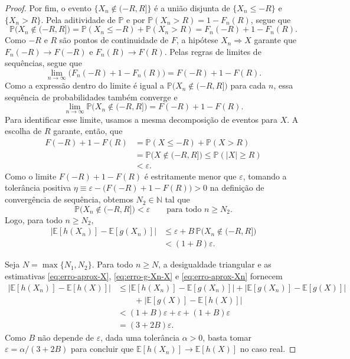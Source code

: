 \documentclass[12pt,portuguese]{article}
\theoremstyle{definition}
\theoremstyle{plainexercise}
\theoremstyle{starredexercise}
\theoremstyle{definition}
\begin{document}
\begin{proof}
Por fim, o evento $\{X_n\notin(-R,R]\}$ é a união disjunta de
$\{X_n\leqslant -R\}$ e $\{X_n>R\}$. Pela aditividade de $\mathbb{P}$ e por
$\mathbb{P}(X_n>R)=1-F_n(R)$, segue que
\[
\mathbb{P}\bigl(X_n\notin(-R,R]\bigr)
=\mathbb{P}(X_n\leqslant -R)+\mathbb{P}(X_n>R)
=F_n(-R)+1-F_n(R).
\]
Como $-R$ e $R$ são pontos de continuidade de $F$, a hipótese
$X_n\Rightarrow X$ garante que $F_n(-R)\to F(-R)$ e $F_n(R)\to F(R)$.
Pelas regras de limites de sequências, segue que
\[
\lim_{n\to\infty}\bigl(F_n(-R)+1-F_n(R)\bigr)
=F(-R)+1-F(R).
\]
Como a expressão dentro do limite é igual a
$\mathbb{P}\bigl(X_n\notin(-R,R]\bigr)$ para cada $n$, essa sequência de
probabilidades também converge e
\[
\lim_{n\to\infty}\mathbb{P}\bigl(X_n\notin(-R,R]\bigr)
=F(-R)+1-F(R).
\]
Para identificar esse limite, usamos a mesma decomposição de eventos para
$X$. A escolha de $R$ garante, então, que
\begin{align*}
F(-R)+1-F(R)
&=\mathbb{P}(X\leqslant -R)+\mathbb{P}(X>R)
\\[0.2cm]
&=\mathbb{P}\bigl(X\notin(-R,R]\bigr)
\leqslant\mathbb{P}(|X|\geqslant R)
\\[0.2cm]
&<\varepsilon.
\end{align*}
Como o limite $F(-R)+1-F(R)$ é estritamente menor que $\varepsilon$, tomando a
tolerância positiva $\eta\equiv\varepsilon-\bigl(F(-R)+1-F(R)\bigr)>0$ na
definição de convergência de sequência, obtemos $N_2\in\mathbb{N}$ tal que
\[
\mathbb{P}\bigl(X_n\notin(-R,R]\bigr)<\varepsilon
\qquad\text{para todo }n\geqslant N_2.
\]
Logo, para todo $n\geqslant N_2$,
\begin{align}\label{eq:erro-aprox-Xn}
\bigl|\mathbb{E}[h(X_n)]-\mathbb{E}[g(X_n)]\bigr|
&\leqslant\varepsilon+B\,\mathbb{P}\bigl(X_n\notin(-R,R]\bigr)
\nonumber\\[0.2cm]
&<(1+B)\varepsilon.
\end{align}

Seja $N=\max\{N_1,N_2\}$. Para todo $n\geqslant N$, a desigualdade triangular e
as estimativas \eqref{eq:erro-aprox-X}, \eqref{eq:erro-g-Xn-X} e
\eqref{eq:erro-aprox-Xn} fornecem
\begin{align*}
\bigl|\mathbb{E}[h(X_n)]-\mathbb{E}[h(X)]\bigr|
&\leqslant
\bigl|\mathbb{E}[h(X_n)]-\mathbb{E}[g(X_n)]\bigr|
+\bigl|\mathbb{E}[g(X_n)]-\mathbb{E}[g(X)]\bigr|
\\[0.4cm]
&\qquad+\bigl|\mathbb{E}[g(X)]-\mathbb{E}[h(X)]\bigr|\\[0.4cm]
&<(1+B)\varepsilon+\varepsilon+(1+B)\varepsilon\\[0.4cm]
&=(3+2B)\varepsilon.
\end{align*}
Como $B$ não depende de $\varepsilon$, dada uma tolerância $\alpha>0$, basta
tomar $\varepsilon=\alpha/(3+2B)$ para concluir que
$\mathbb{E}[h(X_n)]\to\mathbb{E}[h(X)]$ no caso real.


\end{proof}
\end{document}
